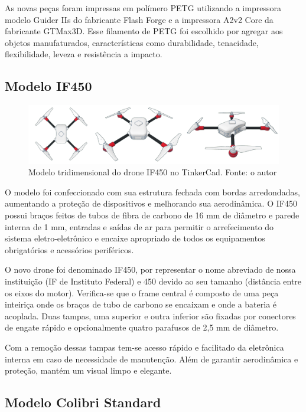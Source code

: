 \documentclass[conference]{IEEEtran}
\begin{document}
As novas peças foram impressas em polímero PETG utilizando  a impressora modelo Guider IIs do fabricante Flash Forge e a impressora A2v2 Core da fabricante GTMax3D. Esse filamento de PETG foi escolhido por agregar aos objetos manufaturados, características como durabilidade, tenacidade, flexibilidade, leveza e resistência a impacto.

\subsection{Modelo IF450}

\begin{figure}[!htb]
    \centering
    \includegraphics[scale=0.14]{img/IF450.png} 
    \caption{Modelo tridimensional do drone IF450 no TinkerCad. Fonte: o autor}
    \label{fig:my_label}
\end{figure}

O modelo foi confeccionado com sua estrutura fechada com bordas arredondadas, aumentando a proteção de dispositivos e melhorando sua aerodinâmica. O IF450 possui braços feitos de tubos de fibra de carbono de 16 mm de diâmetro e parede interna de 1 mm, entradas e saídas de ar para permitir o arrefecimento do sistema eletro-eletrônico e encaixe apropriado de todos os equipamentos obrigatórios e acessórios periféricos. 

O novo drone foi denominado IF450, por representar o nome abreviado de nossa instituição (IF de Instituto Federal) e 450 devido ao seu tamanho (distância entre os eixos do motor). Verifica-se que o frame central é composto de uma peça inteiriça onde os braços de tubo de carbono se encaixam e onde a bateria é acoplada. Duas tampas, uma superior e outra inferior são fixadas por conectores de engate rápido e opcionalmente quatro parafusos de 2,5 mm de diâmetro. 

Com a remoção dessas tampas tem-se acesso rápido e facilitado da eletrônica interna em caso de necessidade de manutenção. Além de garantir aerodinâmica e proteção, mantém um visual limpo e elegante.


\subsection{Modelo Colibri Standard}
\end{document}
